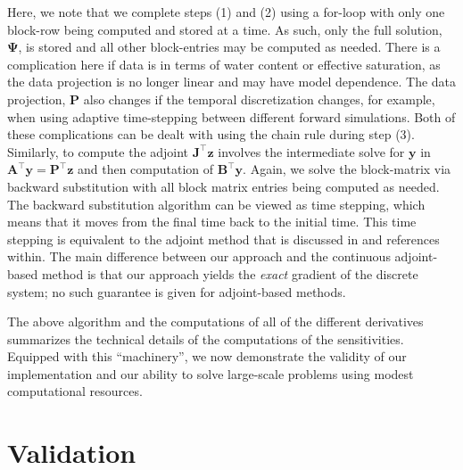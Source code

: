 \documentclass[preprint,review,3p,times,onecolumn,authoryear]{elsarticle}
\newcommand{\bfA}{\mathbf{A}}
\newcommand{\bfB}{\mathbf{B}}
\newcommand{\bfJ}{\mathbf{J}}
\newcommand{\bfP}{\mathbf{P}}
\newcommand{\bfy}{\mathbf{y}}
\newcommand{\bfz}{\mathbf{z}}
\newcommand{\bfPsi}{\boldsymbol{\Psi}}
\begin{document}
Here, we note that we complete steps (1) and (2) using a for-loop with only one block-row being computed and stored at a time. As such, only the full solution, $\bfPsi$, is stored and all other block-entries may be computed as needed. There is a complication here if data is in terms of water content or effective saturation, as the data projection is no longer linear and may have model dependence. The data projection, $\bfP$ also changes if the temporal discretization changes, for example, when using adaptive time-stepping between different forward simulations. Both of these complications can be dealt with using the chain rule during step (3). Similarly, to compute the adjoint $\bfJ^\top \bfz$ involves the intermediate solve for $\bfy$ in $\bfA^\top \bfy = \bfP^\top \bfz$ and then computation of $\bfB^\top \bfy$. Again, we solve the block-matrix via backward substitution with all block matrix entries being computed as needed. The backward substitution algorithm can be viewed as time stepping, which means that it moves from the final time back to the initial time. This time stepping is equivalent to the adjoint method that is discussed in \cite{DeanChen2011} and references within. The main difference between our approach and the continuous adjoint-based method is that our approach yields the {\em exact} gradient of the discrete system; no such guarantee is given for adjoint-based methods.

The above algorithm and the computations of all of the different derivatives summarizes the technical details of the computations of the sensitivities. Equipped with this ``machinery'', we now demonstrate the validity of our implementation and our ability to solve large-scale problems using modest computational resources.


\section{Validation}
\label{sec:richards-validation}
\end{document}
